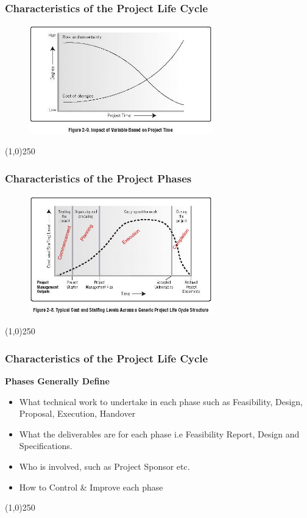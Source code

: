 \begin{frame}
\frametitle{Characteristics of the Project Life Cycle}
 \begin{figure}
 	\centering
 		\includegraphics[width = 8cm]{images/Fig2-9.jpg}
 	\label{fig:2-9}
 \end{figure}
\end{frame}
\begin{center}\line(1,0){250}\end{center}



\begin{frame}
\frametitle{Characteristics of the Project Phases}
 \begin{figure}
 	\centering
 		\includegraphics[width = 8cm]{images/Fig2-8edit.jpg}
 	\label{fig:2-8edit}
 \end{figure}
\end{frame}
\begin{center}\line(1,0){250}\end{center}



\begin{frame}
\frametitle{Characteristics of the Project Life Cycle}
\textbf{Phases Generally Define}\\
\begin{itemize}
	\item What technical work to undertake in each phase such as Feasibility, Design, Proposal, Execution, Handover
	\item What the deliverables are for each phase i.e Feasibility Report, Design and Specifications.
	\item Who is involved, such as Project Sponsor etc.
	\item How to Control \& Improve each phase
\end{itemize}
\end{frame}
\begin{center}\line(1,0){250}\end{center}



